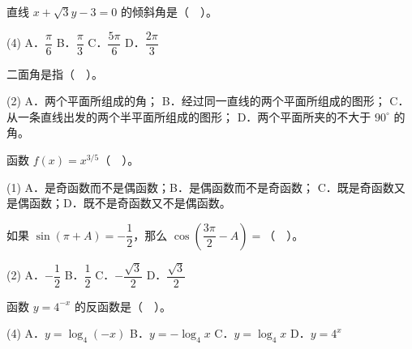 


\begin{question}
直线 $x+\sqrt3y-3=0$ 的倾斜角是（　）。

\begin{gkopts}(4)
\task A．$\dfrac\pi6$
\task B．$\dfrac\pi3$
\task C．$\dfrac{5\pi}6$
\task D．$\dfrac{2\pi}3$
\end{gkopts}

\end{question}
\begin{question}
二面角是指（　）。

\begin{gkopts}(2)
\task A．两个平面所组成的角；
\task B．经过同一直线的两个平面所组成的图形；
\task C．从一条直线出发的两个半平面所组成的图形；
\task D．两个平面所夹的不大于 $90^\circ$ 的角。
\end{gkopts}

\end{question}
\begin{question}
函数 $f(x)=x^{3/5}$（　）。

\begin{gkopts}(1)
\task A．是奇函数而不是偶函数；B．是偶函数而不是奇函数；
\task C．既是奇函数又是偶函数；D．既不是奇函数又不是偶函数。
\end{gkopts}

\end{question}
\begin{question}
如果 $\sin(\pi+A)=-\dfrac12$，那么 $\cos\left(\dfrac{3\pi}2-A\right)=$（　）。

\begin{gkopts}(2)
\task A．$-\dfrac12$
\task B．$\dfrac12$
\task C．$-\dfrac{\sqrt3}2$
\task D．$\dfrac{\sqrt3}2$
\end{gkopts}

\end{question}
\begin{question}
函数 $y=4^{-x}$ 的反函数是（　）。

\begin{gkopts}(4)
\task A．$y=\log_4(-x)$
\task B．$y=-\log_4x$
\task C．$y=\log_4x$
\task D．$y=4^x$
\end{gkopts}

\end{question}

